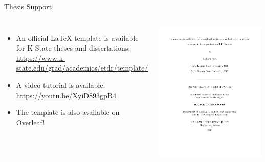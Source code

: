 \documentclass[aspectratio=1610]{beamer}
\begin{document}
\begin{frame}[fragile]{Thesis Support}

  \begin{columns}[T]


      \begin{itemize}
      \item An official \LaTeX{} template is available for K-State theses and dissertations:\\
          \url{https://www.k-state.edu/grad/academics/etdr/template/}
      \item A video tutorial is available:\\
          \url{https://youtu.be/XyiD893gpR4}
      \item The template is also available on Overleaf!
      \end{itemize}


      \includegraphics[width=0.99\textwidth, frame]{example_thesis.pdf}

  \end{columns}

\end{frame}
\end{document}
